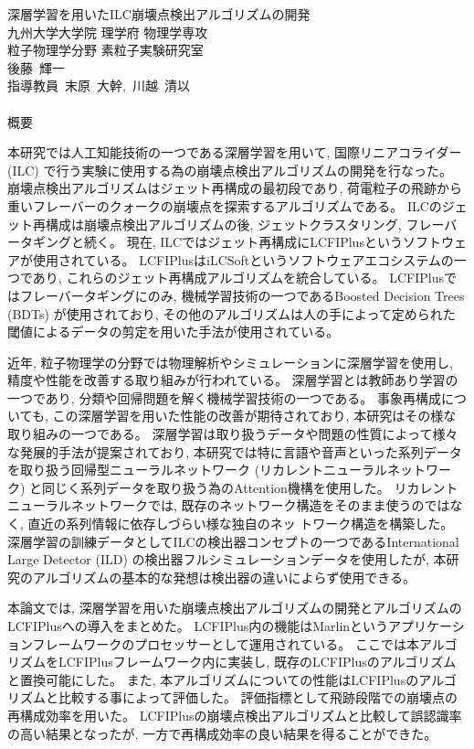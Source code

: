 
\begin{center}
\thispagestyle{empty}
{\Large 深層学習を用いたILC崩壊点検出アルゴリズムの開発}\\
九州大学大学院 理学府 物理学専攻 \\ 粒子物理学分野 素粒子実験研究室 \\
後藤\ 輝一 \\[1ex] 指導教員\ 末原\ 大幹,\ 川越\ 清以\\ 　 \\
\fi
{\huge 概要}\\
\end{center}

本研究では人工知能技術の一つである深層学習を用いて, 国際リニアコライダー (ILC) で行う実験に使用する為の崩壊点検出アルゴリズムの開発を行なった。
崩壊点検出アルゴリズムはジェット再構成の最初段であり, 荷電粒子の飛跡から重いフレーバーのクォークの崩壊点を探索するアルゴリズムである。
ILCのジェット再構成は崩壊点検出アルゴリズムの後, ジェットクラスタリング, フレーバータギングと続く。
現在, ILCではジェット再構成にLCFIPlusというソフトウェアが使用されている。
LCFIPlusはiLCSoftというソフトウェアエコシステムの一つであり, これらのジェット再構成アルゴリズムを統合している。
LCFIPlusではフレーバータギングにのみ, 機械学習技術の一つであるBoosted Decision Trees (BDTs) が使用されており, その他のアルゴリズムは人の手によって定められた閾値によるデータの剪定を用いた手法が使用されている。

近年, 粒子物理学の分野では物理解析やシミュレーションに深層学習を使用し, 精度や性能を改善する取り組みが行われている。
深層学習とは教師あり学習の一つであり, 分類や回帰問題を解く機械学習技術の一つである。
事象再構成についても, この深層学習を用いた性能の改善が期待されており, 本研究はその様な取り組みの一つである。
深層学習は取り扱うデータや問題の性質によって様々な発展的手法が提案されており, 本研究では特に言語や音声といった系列データを取り扱う回帰型ニューラルネットワーク (リカレントニューラルネットワーク) と同じく系列データを取り扱う為のAttention機構を使用した。
リカレントニューラルネットワークでは, 既存のネットワーク構造をそのまま使うのではなく, 直近の系列情報に依存しづらい様な独自のネッ トワーク構造を構築した。
深層学習の訓練データとしてILCの検出器コンセプトの一つであるInternational Large Detector (ILD) の検出器フルシミュレーションデータを使用したが, 本研究のアルゴリズムの基本的な発想は検出器の違いによらず使用できる。

本論文では, 深層学習を用いた崩壊点検出アルゴリズムの開発とアルゴリズムのLCFIPlusへの導入をまとめた。
LCFIPlus内の機能はMarlinというアプリケーションフレームワークのプロセッサーとして運用されている。
ここでは本アルゴリズムをLCFIPlusフレームワーク内に実装し, 既存のLCFIPlusのアルゴリズムと置換可能にした。
また, 本アルゴリズムについての性能はLCFIPlusのアルゴリズムと比較する事によって評価した。
評価指標として飛跡段階での崩壊点の再構成効率を用いた。
LCFIPlusの崩壊点検出アルゴリズムと比較して誤認識率の高い結果となったが, 一方で再構成効率の良い結果を得ることができた。